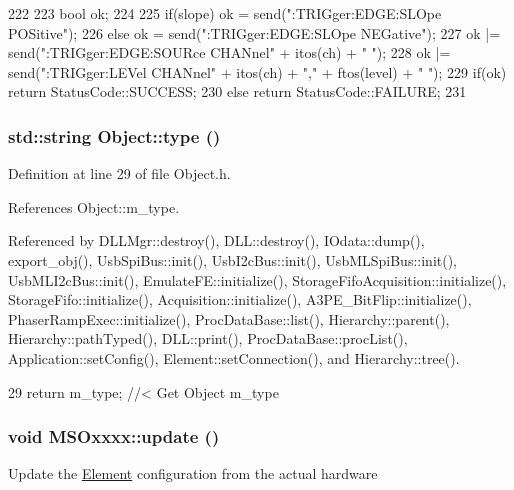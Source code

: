 \begin{DoxyCode}
222 {
223     bool ok;
224 
225     if(slope) ok  = send(":TRIGger:EDGE:SLOpe POSitive\n");
226     else            ok  = send(":TRIGger:EDGE:SLOpe NEGative\n");
227                         ok |= send(":TRIGger:EDGE:SOURce CHANnel" + itos(ch) + " 
      \n");
228                         ok |= send(":TRIGger:LEVel CHANnel" + itos(ch) + "," + 
      ftos(level) + " \n");
229     if(ok)  return StatusCode::SUCCESS;
230     else        return StatusCode::FAILURE; 
231 }
\end{DoxyCode}
\hypertarget{classObject_a84f99f70f144a83e1582d1d0f84e4e62}{
\subsubsection[{type}]{\setlength{\rightskip}{0pt plus 5cm}std::string Object::type ()}}
\label{classObject_a84f99f70f144a83e1582d1d0f84e4e62}


Definition at line 29 of file Object.h.

References Object::m\_\-type.

Referenced by DLLMgr::destroy(), DLL::destroy(), IOdata::dump(), export\_\-obj(), UsbSpiBus::init(), UsbI2cBus::init(), UsbMLSpiBus::init(), UsbMLI2cBus::init(), EmulateFE::initialize(), StorageFifoAcquisition::initialize(), StorageFifo::initialize(), Acquisition::initialize(), A3PE\_\-BitFlip::initialize(), PhaserRampExec::initialize(), ProcDataBase::list(), Hierarchy::parent(), Hierarchy::pathTyped(), DLL::print(), ProcDataBase::procList(), Application::setConfig(), Element::setConnection(), and Hierarchy::tree().


\begin{DoxyCode}
29 { return m_type;       } //< Get Object m_type
\end{DoxyCode}
\hypertarget{classMSOxxxx_a09452d6e75cd9adfaec93606fbb998dc}{
\subsubsection[{update}]{\setlength{\rightskip}{0pt plus 5cm}void MSOxxxx::update ()}}
\label{classMSOxxxx_a09452d6e75cd9adfaec93606fbb998dc}
Update the \hyperlink{classElement}{Element} configuration from the actual hardware 

